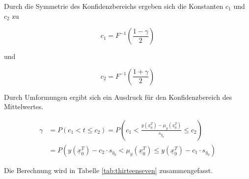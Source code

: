 \noindent Durch die Symmetrie des Konfidenzbereichs ergeben sich die Konstanten $c_{1}$ und $c_{2}$ zu

\begin{equation}\label{eq:thirteensixtyseven}
c_{1} =F^{-1} \left(\frac{1-\gamma }{2} \right)
\end{equation}

\noindent und

\begin{equation}\label{eq:thirteensixtyeight}
c_{2} =F^{-1} \left(\frac{1+\gamma }{2} \right)
\end{equation}

\noindent Durch Umformungen ergibt sich ein Ausdruck f\"{u}r den Konfidenzbereich des Mittelwertes.

\begin{equation}\label{eq:thirteensixtynine}
\begin{split}
\gamma & = P\left(c_{1} <t\le c_{2} \right)=P\left(c_{1} <\frac{y\left(\underline{x}_{0}^{T} \right)-\mu _{y} \left(\underline{x}_{0}^{T} \right)}{s_{y_{0} } } \le c_{2} \right) \\ 
& = P\left(y\left(\underline{x}_{0}^{T} \right)-c_{2} \cdot s_{y_{0} } <\mu _{y} \left(\underline{x}_{0}^{T} \right)\le y\left(\underline{x}_{0}^{T} \right)-c_{1} \cdot s_{y_{0} } \right)
\end{split}
\end{equation}

\noindent Die Berechnung wird in Tabelle \ref{tab:thirteenseven} zusammengefasst.

